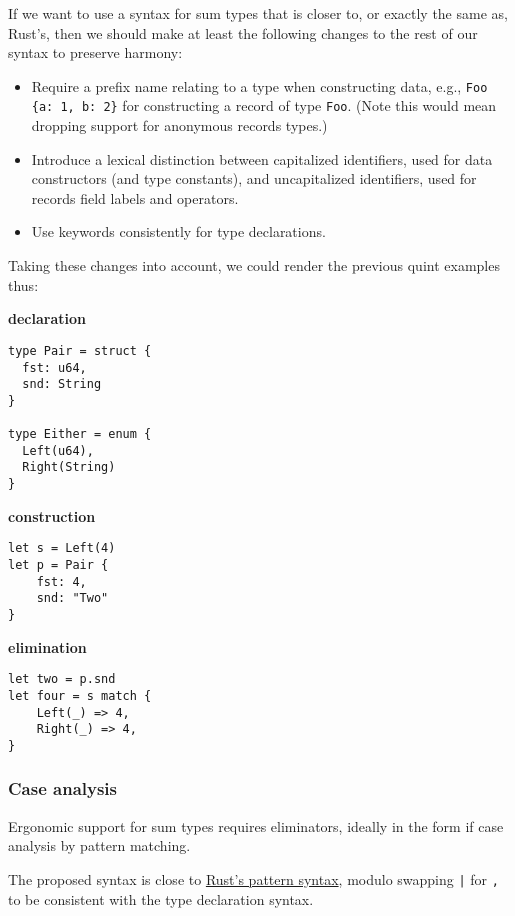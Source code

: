 \documentclass[11pt]{article}
\begin{document}
\begin{enumerate}
If we want to use a syntax for sum types that is closer to, or exactly the same
as, Rust's, then we should make at least the following changes to the rest of
our syntax to preserve harmony:

\begin{itemize}
\item Require a prefix name relating to a type when constructing data, e.g., \texttt{Foo
  \{a: 1, b: 2\}} for constructing a record of type \texttt{Foo}. (Note this would mean
dropping support for anonymous records types.)
\item Introduce a lexical distinction between capitalized identifiers, used for
data constructors (and type constants), and uncapitalized identifiers, used
for records field labels and operators.
\item Use keywords consistently for type declarations.
\end{itemize}

Taking these changes into account, we could render the previous quint examples
thus:

\textbf{declaration}

\begin{verbatim}
type Pair = struct {
  fst: u64,
  snd: String
}

type Either = enum {
  Left(u64),
  Right(String)
}
\end{verbatim}

\textbf{construction}

\begin{verbatim}
let s = Left(4)
let p = Pair {
    fst: 4,
    snd: "Two"
}
\end{verbatim}

\textbf{elimination}

\begin{verbatim}
let two = p.snd
let four = s match {
    Left(_) => 4,
    Right(_) => 4,
}
\end{verbatim}
\end{enumerate}


\subsubsection{Case analysis}
\label{sec:org2363e85}
Ergonomic support for sum types requires eliminators, ideally in the
form if case analysis by pattern matching.

The proposed syntax is close to \href{https://doc.rust-lang.org/book/ch18-03-pattern-syntax.html\#matching-literals}{Rust's pattern syntax}, modulo swapping \texttt{|}
for \texttt{,} to be consistent with the type declaration syntax.
\end{document}
